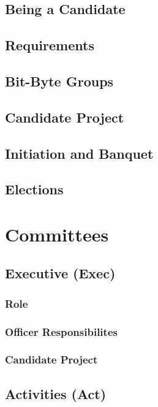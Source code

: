\documentclass[11pt, article, oneside]{memoir}
\begin{document}
    \section{Being a Candidate}
    \section{Requirements}
    \section{Bit-Byte Groups}
    \section{Candidate Project}
    \section{Initiation and Banquet}
    \section{Elections}



    \newpage
    \chapter{Committees}
    \section{Executive (Exec)}
    \subsection{Role}

    \subsection{Officer Responsibilites}

    \subsection{Candidate Project}

    \bigbreak



    \section{Activities (Act)}
\end{document}
